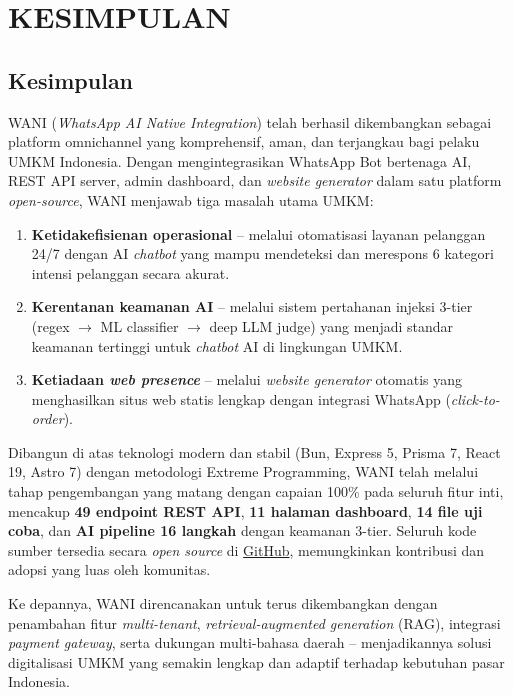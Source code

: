 \documentclass[12pt,a4paper,oneside]{article}
\newcommand{\bab}[1]{%
    \newpage
    \section{#1}%
}
\newcommand{\sub}[1]{%
    \subsection{#1}%
}
\begin{document}
\bab{KESIMPULAN}

\sub{Kesimpulan}

WANI (\textit{WhatsApp AI Native Integration}) telah berhasil dikembangkan sebagai platform omnichannel yang komprehensif, aman, dan terjangkau bagi pelaku UMKM Indonesia. Dengan mengintegrasikan WhatsApp Bot bertenaga AI, REST API server, admin dashboard, dan \textit{website generator} dalam satu platform \textit{open-source}, WANI menjawab tiga masalah utama UMKM:

\begin{enumerate}
	\item \textbf{Ketidakefisienan operasional} -- melalui otomatisasi layanan pelanggan 24/7 dengan AI \textit{chatbot} yang mampu mendeteksi dan merespons 6 kategori intensi pelanggan secara akurat.
	\item \textbf{Kerentanan keamanan AI} -- melalui sistem pertahanan injeksi 3-tier (regex $\rightarrow$ ML classifier $\rightarrow$ deep LLM judge) yang menjadi standar keamanan tertinggi untuk \textit{chatbot} AI di lingkungan UMKM.
	\item \textbf{Ketiadaan \textit{web presence}} -- melalui \textit{website generator} otomatis yang menghasilkan situs web statis lengkap dengan integrasi WhatsApp (\textit{click-to-order}).
\end{enumerate}

\noindent
Dibangun di atas teknologi modern dan stabil (Bun, Express 5, Prisma 7, React 19, Astro 7) dengan metodologi Extreme Programming, WANI telah melalui tahap pengembangan yang matang dengan capaian 100\% pada seluruh fitur inti, mencakup \textbf{49 endpoint REST API}, \textbf{11 halaman dashboard}, \textbf{14 file uji coba}, dan \textbf{AI pipeline 16 langkah} dengan keamanan 3-tier. Seluruh kode sumber tersedia secara \textit{open source} di \href{https://github.com/FarrelGhozy/WANI}{GitHub}, memungkinkan kontribusi dan adopsi yang luas oleh komunitas.

Ke depannya, WANI direncanakan untuk terus dikembangkan dengan penambahan fitur \textit{multi-tenant}, \textit{retrieval-augmented generation} (RAG), integrasi \textit{payment gateway}, serta dukungan multi-bahasa daerah -- menjadikannya solusi digitalisasi UMKM yang semakin lengkap dan adaptif terhadap kebutuhan pasar Indonesia.
\end{document}
